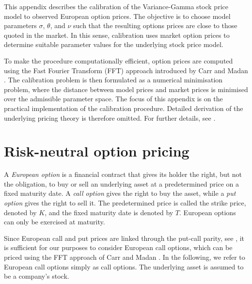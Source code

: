 \label{appendix: Calibration Procedure}
This appendix describes the calibration of the Variance-Gamma stock price model to observed European option prices. The objective is to choose model parameters $\sigma$, $\theta$, and $\nu$ such that the resulting options prices are close to those quoted in the market. In this sense, calibration uses market option prices to determine suitable parameter values for the underlying stock price model.

To make the procedure computationally efficient, option prices are computed using the Fast Fourier Transform (FFT) approach introduced by Carr and Madan \cite{carr1999option}. The calibration problem is then formulated as a numerical minimisation problem, where the distance between model prices and market prices is minimised over the admissible parameter space. The focus of this appendix is on the practical implementation of the calibration procedure. Detailed derivation of the underlying pricing theory is therefore omitted. For further details, see \cite{carr1999option, jarrow2018continuous, madan1998variance, schoutens2003levy}.

\section{Risk-neutral option pricing}
\label{appendix: Risk-neutral option pricing theory}
A \emph{European option} is a financial contract that gives its holder the right, but not the obligation, to buy or sell an underlying asset at a predetermined price on a fixed maturity date. A \emph{call option} gives the right to buy the asset, while a \emph{put option} gives the right to sell it. The predetermined price is called the strike price, denoted by $K$, and the fixed maturity date is denoted by $T$. European options can only be exercised at maturity. 

Since European call and put prices are linked through the put-call parity, see \cite[p.85]{jarrow2018continuous}, it is sufficient for our purposes to consider European call options, which can be priced using the FFT approach of Carr and Madan \cite{carr1999option}. In the following, we refer to European call options simply as call options. The underlying asset is assumed to be a company's stock.

